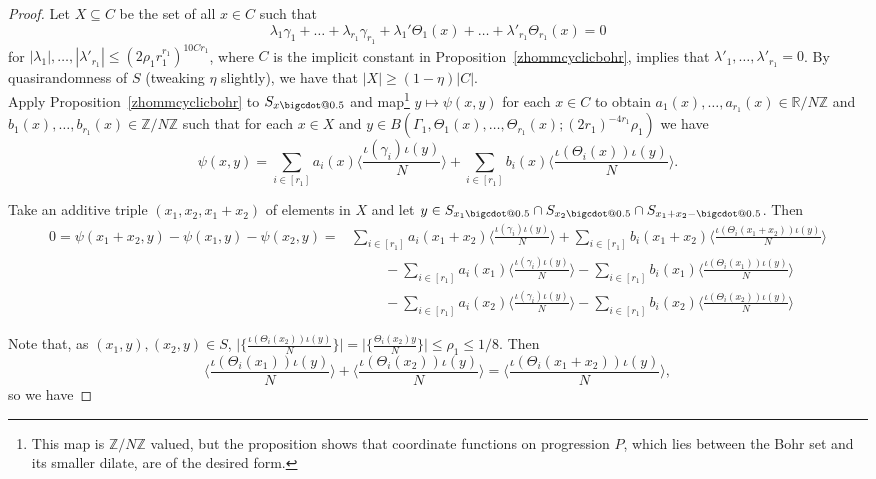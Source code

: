 \documentclass[a4paper,11pt]{article}
\makeatletter
\numberwithin{theorem}{section}
\theoremstyle{definition}
\newcommand{\blr}[1]{
    \Big\langle #1\Big\rangle
}
\newcommand*\bcdot{\mathpalette\bigcdot@{0.5}}
\newcommand*\bigcdot@[2]{\mathbin{\vcenter{\hbox{\scalebox{#2}{$\m@th#1\bullet$}}}}}
\makeatother
\begin{document}
\begin{proof}
    Let $X \subseteq C$ be the set of all $x \in C$ such that
    \[\lambda_1 \gamma_1 + \dots + \lambda_{r_1}\gamma_{r_1} + \lambda_1'\Theta_1(x) + \dots + \lambda'_{r_1}\Theta_{r_1}(x) = 0\]
    for $|\lambda_1|, \dots, |\lambda'_{r_1}| \leq (2\rho_1 r_1^{r_1})^{10Cr_1}$, where $C$ is the implicit constant in Proposition~\ref{zhommcyclicbohr}, implies that $\lambda'_1, \dots, \lambda'_{r_1} = 0$. By quasirandomness of $S$ (tweaking $\eta$ slightly), we have that $|X| \geq (1 - \eta) |C|$.\\
    Apply Proposition~\ref{zhommcyclicbohr} to $S_{x \bcdot}$ and map\footnote{This map is $\mathbb{Z}/N\mathbb{Z}$ valued, but the proposition shows that coordinate functions on progression $P$, which lies between the Bohr set and its smaller dilate, are of the desired form.} $y \mapsto \psi(x, y)$ for each $x \in C$ to obtain $a_1(x), \dots, a_{r_1}(x) \in \mathbb{R}/N\mathbb{Z}$ and $b_1(x), \dots, b_{r_1}(x) \in \mathbb{Z}/N\mathbb{Z}$ such that for each $x \in X$ and $y \in B(\Gamma_1, \Theta_1(x), \dots, \Theta_{r_1}(x); (2r_1)^{-4r_1}\rho_1)$ we have
    \[\psi(x,y) = \sum_{i \in [r_1]} a_i(x) \blr{\frac{\iota(\gamma_i) \iota(y)}{N}} + \sum_{i \in [r_1]} b_i(x) \blr{\frac{\iota(\Theta_i(x)) \iota(y)}{N}}.\]

    Take an additive triple $(x_1, x_2, x_1 + x_2)$ of elements in $X$ and let $y \in S_{x_1 \bcdot} \cap S_{x_2 \bcdot} \cap S_{x_1 + x_2 - \bcdot}$. Then
    \begin{align*}
        0 = \psi(x_1 + x_2,y) - \psi(x_1,y) - \psi(x_2,y)  = &\sum_{i \in [r_1]} a_i(x_1 + x_2) \blr{\frac{\iota(\gamma_i) \iota(y)}{N}} + \sum_{i \in [r_1]} b_i(x_1 + x_2) \blr{\frac{\iota(\Theta_i(x_1 + x_2)) \iota(y)}{N}}\\
        &\hspace{1cm}- \sum_{i \in [r_1]} a_i(x_1) \blr{\frac{\iota(\gamma_i) \iota(y)}{N}} -\sum_{i \in [r_1]} b_i(x_1) \blr{\frac{\iota(\Theta_i(x_1)) \iota(y)}{N}}\\
        &\hspace{1cm} -\sum_{i \in [r_1]} a_i(x_2) \blr{\frac{\iota(\gamma_i) \iota(y)}{N}} - \sum_{i \in [r_1]} b_i(x_2) \blr{\frac{\iota(\Theta_i(x_2)) \iota(y)}{N}}
    \end{align*}

   Note that, as $(x_1, y), (x_2, y) \in S$, $\Big|\Big\{\frac{\iota(\Theta_i(x_2)) \iota(y)}{N}\Big\}\Big| = \Big|\Big\{\frac{\Theta_i(x_2)y}{N}\Big\}\Big|\leq \rho_1 \leq 1/8$. Then 
    \[\blr{\frac{\iota(\Theta_i(x_1)) \iota(y)}{N}} + \blr{\frac{\iota(\Theta_i(x_2)) \iota(y)}{N}} = \blr{\frac{\iota(\Theta_i(x_1 + x_2)) \iota(y)}{N}},\]
    so we have


\end{proof}
\end{document}
